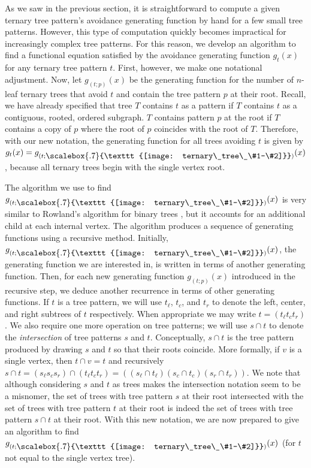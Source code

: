\documentclass[12pt]{article}
\newcommand{\st}[2]{\ensuremath{\vcenter{\hbox{\scalebox{.7}{\texttt{[image: ternary\_tree\_\#1-\#2]}}}}}}
\begin{document}
As we saw in the previous section, it is straightforward to compute a given ternary tree pattern's avoidance generating function by hand for a few small tree patterns.  However, this type of computation quickly becomes impractical for increasingly complex tree patterns.  For this reason, we develop an algorithm to find a functional equation satisfied by the avoidance generating function $g_t(x)$ for any ternary tree pattern $t$.  First, however, we make one notational adjustment.  Now, let $g_{(t;p)}(x)$ be the generating function for the number of $n$-leaf ternary trees that avoid $t$ and contain the tree pattern $p$ at their root.  Recall, we have already specified that tree $T$ contains $t$ as a pattern if $T$ contains $t$ as a contiguous, rooted, ordered subgraph.  $T$ contains pattern $p$ at the root if $T$ contains a copy of $p$ where the root of $p$ coincides with the root of $T$.  Therefore, with our new notation, the generating function for all trees avoiding $t$ is given by $g_t(x)=g_{(t;\st{1}{1})}(x)$, because all ternary trees begin with the single vertex root.

The algorithm we use to find $g_{(t;\st{1}{1})}(x)$ is very similar to Rowland's algorithm for binary trees \cite{Rowland10}, but it accounts for an additional child at each internal vertex. The algorithm produces a sequence of generating functions using a recursive method. Initially, $g_{(t;\st{1}{1})}(x)$, the generating function we are interested in, is written in terms of another generating function. Then, for each new generating function $g_{(t;p)}(x)$ introduced in the recursive step, we deduce another recurrence in terms of other generating functions. If $t$ is a tree pattern, we will use $t_\ell$, $t_c$, and $t_r$ to denote the left, center, and right subtrees of $t$ respectively.  When appropriate we may write $t=\left(t_\ell t_ct_r\right)$.  We also require one more operation on tree patterns; we will use $s \cap t$ to denote the \emph{intersection} of tree patterns $s$ and $t$.  Conceptually, $s \cap t$ is the tree pattern produced by drawing $s$ and $t$ so that their roots coincide.  More formally, if $v$ is a single vertex, then $t \cap v = t$ and recursively $s \cap t = (s_\ell s_cs_r) \cap (t_\ell t_ct_r) = \left(\left(s_\ell \cap t_\ell \right)\left(s_c \cap t_c\right)\left(s_r \cap t_r\right)\right)$.  We note that although considering $s$ and $t$ as trees makes the intersection notation seem to be a misnomer, the set of trees with tree pattern $s$ at their root intersected with the set of trees with tree pattern $t$ at their root is indeed the set of trees with tree pattern $s \cap t$ at their root.  With this new notation, we are now prepared to give an algorithm to find $g_{(t;\st{1}{1})}(x)$ (for $t$ not equal to the single vertex tree).
\end{document}
